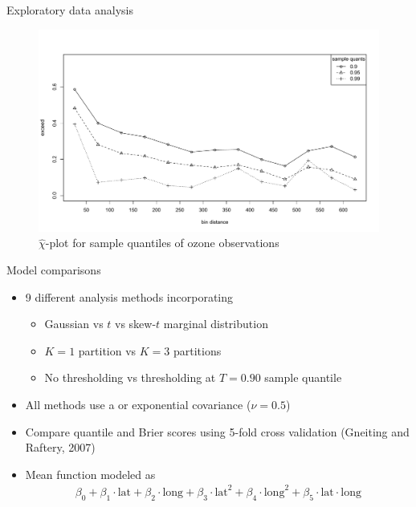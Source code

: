 \documentclass{beamer}
\begin{document}
\begin{frame}{Exploratory data analysis}
	\centering
  \begin{figure}
    \includegraphics[width=1\linewidth]{./plots/chi-plot-ozone-res.pdf}
    \caption{$\widehat{\chi}$-plot for sample quantiles of ozone observations}
  \end{figure}
\end{frame}

\begin{frame}{Model comparisons}
  \begin{itemize} \setlength{\itemsep}{0.5em}
    \item 9 different analysis methods incorporating
    \begin{itemize}
      \item Gaussian vs $t$ vs skew-$t$ marginal distribution
      \item $K=1$ partition vs $K=3$ partitions
      \item No thresholding vs thresholding at $T=0.90$ sample quantile
    \end{itemize}
    \item All methods use a \Matern or exponential covariance ($\nu = 0.5$)
    \item Compare quantile and Brier scores using 5-fold cross validation (Gneiting and Raftery, 2007)
    \item Mean function modeled as
    \begin{align*}
    	\beta_0 + \beta_1 \cdot \text{lat} + \beta_2 \cdot \text{long} +  \beta_3 \cdot \text{lat}^2 + \beta_4 \cdot \text{long}^2 + \beta_5 \cdot \text{lat} \cdot \text{long} 
    \end{align*}
   \end{itemize}
\end{frame}
\end{document}
